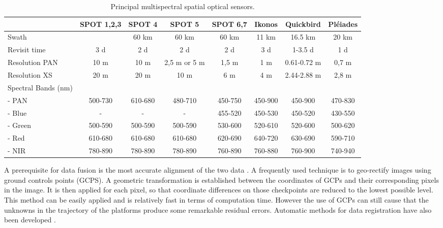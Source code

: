 \begin{table}
\begin{center}

\begin{small}
\begin{tabular}{l|c|c|c|c|c|c|c}


& \textbf{SPOT 1,2,3} & \textbf{SPOT 4} & \textbf{SPOT 5} & \textbf{SPOT 6,7} & \textbf{Ikonos} & \textbf{Quickbird} &\textbf{Pléiades} \\
\hline
%
Swath & & 60 km & 60 km & 60 km & 11 km & 16.5 km & 20 km \\
%
Revisit time & 3 d & 2 d & 2 d & 2 d & 3 d & 1-3.5 d & 1 d \\
%
Resolution PAN & 10 m & 10 m & 2,5 m or 5 m & 1,5 m & 1 m & 0.61-0.72 m & 0,7 m \\
%
Resolution XS & 20 m & 20 m & 10 m & 6 m & 4 m & 2.44-2.88 m & 2,8 m \\
%
Spectral Bands (nm) & & & & & & \\
%
- PAN & 500-730 & 610-680 & 480-710 & 450-750 & 450-900 & 450-900 & 470-830 \\
%
- Blue & - & - & - & 455-520 & 450-530 & 450-520 & 430-550 \\
%
- Green & 500-590 & 500-590 & 500-590 & 530-600 & 520-610 & 520-600 & 500-620 \\
%
- Red & 610-680 & 610-680 & 610-680 & 620-690 & 640-720 & 630-690 & 590-710 \\
%
- NIR & 780-890 & 780-890 & 780-890 & 760-890 & 760-880 & 760-900 & 740-940 \\
\end{tabular}
\end{small}
\end{center}
\caption{Principal multispectral spatial optical sensors.}
\label{table:spatial_satellites}
\end{table}

A prerequisite for data fusion is the most accurate alignment of the two data \citep{torabzadeh2014fusion}. A frequently used technique is to geo-rectify images using ground controls points (GCPS). A geometric transformation is established between the coordinates of GCPs and their corresponding pixels in the image. It is then applied for each pixel, so that coordinate differences on those checkpoints are reduced to the lowest possible level. This method can be easily applied and is relatively fast in terms of computation time. However the use of GCPs can still cause that the unknowns in the trajectory of the platforms produce some remarkable residual errors. Automatic methods for data registration have also been developed \citep{habib2005photogrammetric,mastin2009automatic}. \\

